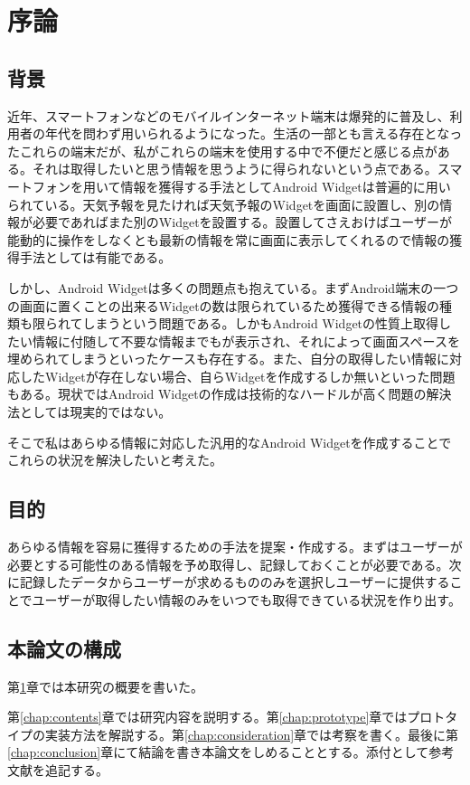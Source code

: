 \chapter{序論}
\label{chap:introduction}
\section{背景}


近年、スマートフォンなどのモバイルインターネット端末は爆発的に普及し、利用者の年代を問わず用いられるようになった。生活の一部とも言える存在となったこれらの端末だが、私がこれらの端末を使用する中で不便だと感じる点がある。それは取得したいと思う情報を思うように得られないという点である。スマートフォンを用いて情報を獲得する手法としてAndroid Widgetは普遍的に用いられている。天気予報を見たければ天気予報のWidgetを画面に設置し、別の情報が必要であればまた別のWidgetを設置する。設置してさえおけばユーザーが能動的に操作をしなくとも最新の情報を常に画面に表示してくれるので情報の獲得手法としては有能である。

しかし、Android Widgetは多くの問題点も抱えている。まずAndroid端末の一つの画面に置くことの出来るWidgetの数は限られているため獲得できる情報の種類も限られてしまうという問題である。しかもAndroid Widgetの性質上取得したい情報に付随して不要な情報までもが表示され、それによって画面スペースを埋められてしまうといったケースも存在する。また、自分の取得したい情報に対応したWidgetが存在しない場合、自らWidgetを作成するしか無いといった問題もある。現状ではAndroid Widgetの作成は技術的なハードルが高く問題の解決法としては現実的ではない。

そこで私はあらゆる情報に対応した汎用的なAndroid Widgetを作成することでこれらの状況を解決したいと考えた。

\section{目的}
あらゆる情報を容易に獲得するための手法を提案・作成する。まずはユーザーが必要とする可能性のある情報を予め取得し、記録しておくことが必要である。次に記録したデータからユーザーが求めるもののみを選択しユーザーに提供することでユーザーが取得したい情報のみをいつでも取得できている状況を作り出す。

\section{本論文の構成}
第\ref{chap:introduction}章では本研究の概要を書いた。

第\ref{chap:contents}章では研究内容を説明する。第\ref{chap:prototype}章ではプロトタイプの実装方法を解説する。第\ref{chap:consideration}章では考察を書く。最後に第\ref{chap:conclusion}章にて結論を書き本論文をしめることとする。添付として参考文献を追記する。
